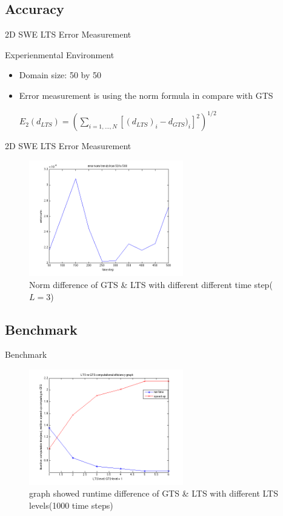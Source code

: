 \documentclass{beamer}
\begin{document}
\subsection{Accuracy}
\begin{frame}[t]{2D SWE LTS Error Measurement}
  \begin{block}{Experienmental Environment}
        \begin{itemize}
            \item Domain size: 50 by 50
            \item Error measurement is using the norm formula in compare with GTS\\
            \begin{center}
            	$E_{2}(d_{LTS}) = (\sum_{i=1,...,N}^{ }[(d_{LTS})_{i} - d_{GTS})_{i}]^{2})^{1/2}$
            \end{center}
        \end{itemize}
    \end{block}
\end{frame}
\begin{frame}{2D SWE LTS Error Measurement}
\begin{figure}[p]
    \centering
    \includegraphics[width=0.6\textwidth]{2d_lts_error}
    \caption{Norm difference of GTS \& LTS with different different time step($L=3$)}
    \label{fig:awesome_image}
\end{figure}
\end{frame}
\subsection{Benchmark}
\begin{frame}{Benchmark}
\begin{figure}[p]
    \centering
    \includegraphics[width=0.6\textwidth]{LTS_runtime}
    \caption{graph showed runtime difference of GTS \& LTS with different LTS levels(1000 time steps)}
    \label{fig:awesome_image}
\end{figure}
\end{frame}
\end{document}
